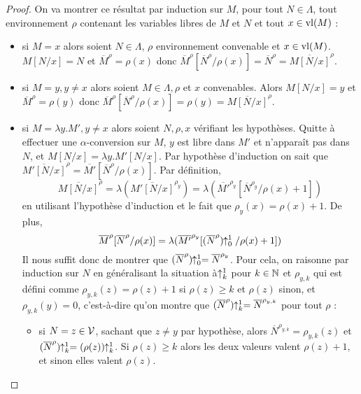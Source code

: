 \begin{proof}
    On va montrer ce résultat par induction sur $M$, pour tout $N\in\Lambda$, tout environnement $\rho$ contenant les variables libres de $M$ et $N$ et tout $x\in\mathrm{vl}(M)$ :
    \begin{itemize}[label=$\bullet$]
        \item si $M = x$ alors soient $N\in\Lambda$, $\rho$ environnement convenable et $x\in\mathrm{vl}(M)$. $M[N/x] = N$ et $\overline M^\rho = \rho(x)$ donc $\overline M^\rho [\overline N^\rho/\rho(x)] = \overline N^\rho = \overline{M[N/x]}^\rho$.
        \item si $M = y,y\neq x$ alors soient $M\in\Lambda,\rho$ et $x$ convenables. Alors $M[N/x] = y$ et $\overline M^\rho = \rho(y)$ donc $\overline M^\rho[\overline N^\rho/\rho(x)] = \rho(y) = \overline{M[N/x]}^\rho$.
        \item si $M = \lambda y.M',y\neq x$ alors soient $N,\rho,x$ vérifiant les hypothèses. Quitte à effectuer une $\alpha$-conversion sur $M$, $y$ est libre dans $M'$ et n'apparaît pas dans $N$, et $M[N/x] = \lambda y. M'[N/x]$. Par hypothèse d'induction on sait que $\overline{M'[N/x]}^\rho = \overline{M'}[\overline N^\rho/\rho(x)]$. Par définition, $$\overline{M[N/x]}^\rho = \lambda (\overline{M'[N/x]}^{\rho_y}) = \lambda (\overline{M'}^{\rho_y}[\overline N^{\rho_y}/\rho(x)+1])$$ en utilisant l'hypothèse d'induction et le fait que $\rho_y(x) = \rho(x)+1$. De plus, $$\overline M^\rho [\overline N^\rho/\rho(x)] = \lambda (\overline{M'}^{\rho_y}[(\overline N^\rho)\!\!\uparrow_0^1/\rho(x)+1])$$ Il nous suffit donc de montrer que $(\overline N^\rho)\!\!\uparrow_0^1 = \overline N^{\rho_y}$. Pour cela, on raisonne par induction sur $N$ en généralisant la situation à $\!\!\uparrow_k^1$ pour $k\in\mathbb{N}$ et $\rho_{y,k}$ qui est défini comme $\rho_{y,k}(z) = \rho(z)+1$ si $\rho(z) \geq k$ et $\rho(z)$ sinon, et $\rho_{y,k}(y) = 0$, c'est-à-dire qu'on montre que $(\overline N^\rho)\!\!\uparrow_k^1 = \overline N^{\rho_{y,k}}$ pour tout $\rho$ :
        \begin{itemize}[label=$\bullet$]
            \item si $N = z\in\mathcal V$, sachant que $z\neq y$ par hypothèse, alors $\overline N^{\rho_{y,k}} = \rho_{y,k}(z)$ et $(\overline N^\rho)\!\!\uparrow_k^1 = (\rho(z))\!\!\uparrow_k^1$. Si $\rho(z)\geq k$ alors les deux valeurs valent $\rho(z) + 1$, et sinon elles valent $\rho(z)$.

\end{itemize}
\end{itemize}
\end{proof}
